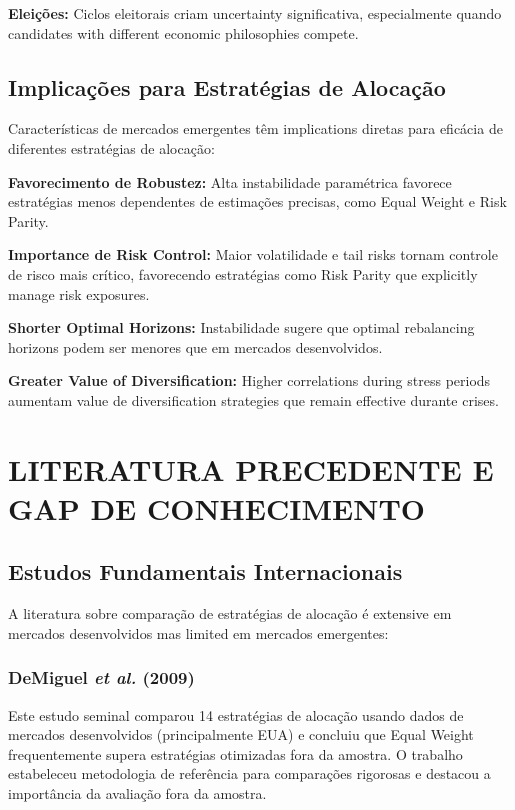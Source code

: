 \textbf{Eleições:} Ciclos eleitorais criam uncertainty significativa, especialmente quando candidates with different economic philosophies compete.

\subsection{Implicações para Estratégias de Alocação}

Características de mercados emergentes têm implications diretas para eficácia de diferentes estratégias de alocação:

\textbf{Favorecimento de Robustez:} Alta instabilidade paramétrica favorece estratégias menos dependentes de estimações precisas, como Equal Weight e Risk Parity.

\textbf{Importance de Risk Control:} Maior volatilidade e tail risks tornam controle de risco mais crítico, favorecendo estratégias como Risk Parity que explicitly manage risk exposures.

\textbf{Shorter Optimal Horizons:} Instabilidade sugere que optimal rebalancing horizons podem ser menores que em mercados desenvolvidos.

\textbf{Greater Value of Diversification:} Higher correlations during stress periods aumentam value de diversification strategies que remain effective durante crises.

\section{LITERATURA PRECEDENTE E GAP DE CONHECIMENTO}

\subsection{Estudos Fundamentais Internacionais}

A literatura sobre comparação de estratégias de alocação é extensive em mercados desenvolvidos mas limited em mercados emergentes:

\subsubsection{DeMiguel \textit{et al.} (2009)}

Este estudo seminal comparou 14 estratégias de alocação usando dados de mercados desenvolvidos (principalmente EUA) e concluiu que Equal Weight frequentemente supera estratégias otimizadas fora da amostra. O trabalho estabeleceu metodologia de referência para comparações rigorosas e destacou a importância da avaliação fora da amostra.

